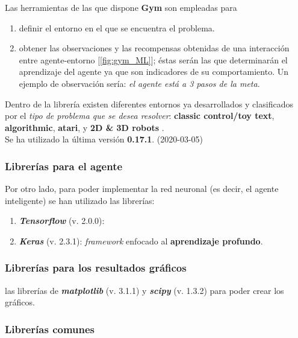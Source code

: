 Las herramientas de las que dispone \textbf{Gym} son empleadas para

\begin{enumerate}
    \item definir el entorno en el que se encuentra el problema.
    \item obtener las observaciones y las recompensas obtenidas de una interacción entre agente-entorno [\ref{fig:gym_ML}]; éstas serán las que determinarán el aprendizaje del agente ya que son indicadores de su comportamiento. Un ejemplo de observación sería: \textit{el agente está a 3 pasos de la meta}. 
\end{enumerate}

Dentro de la librería existen diferentes entornos ya desarrollados y clasificados por el \textit{tipo de problema que se desea resolver}:  \textbf{classic control/toy text}, \textbf{algorithmic}, \textbf{atari}, y  \textbf{2D \& 3D robots} \cite{gymDocumentation}.\\

Se ha utilizado la última versión \textbf{0.17.1}. (2020-03-05)

\subsubsection{Librerías para el agente}

Por otro lado, para poder implementar la red neuronal (es decir, el agente inteligente) se han utilizado las librerías:

\begin{enumerate}
    \item \textbf{\textit{Tensorflow}} (v. 2.0.0): 
    \item \textbf{\textit{Keras}} (v. 2.3.1): \textit{framework} enfocado al \textbf{aprendizaje profundo}. 
   
\end{enumerate}

\subsubsection{Librerías para los resultados gráficos}

las librerías de \textbf{\textit{matplotlib}} (v. 3.1.1) y \textit{\textbf{scipy}} (v. 1.3.2) para poder crear los gráficos. 

\subsubsection{Librerías comunes}

